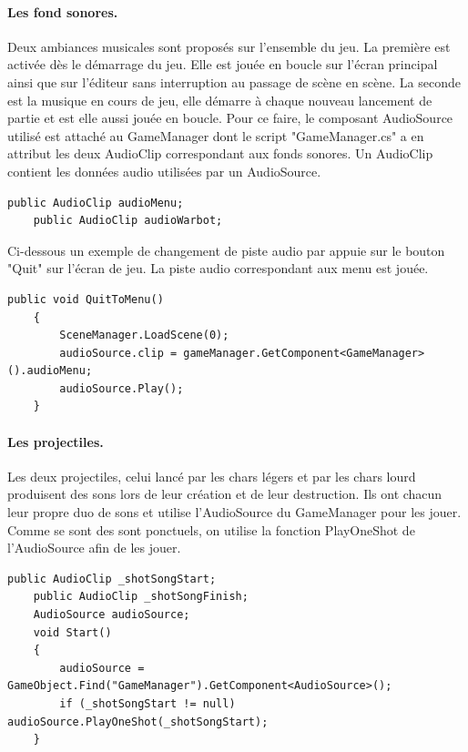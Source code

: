 \documentclass{report}
\begin{document}
\paragraph{Les fond sonores.}
Deux ambiances musicales sont proposés sur l'ensemble du jeu.
\newline La première est activée dès le démarrage du jeu. Elle est jouée en boucle sur l'écran principal ainsi que sur l'éditeur sans interruption au passage de scène en scène.
\newline  La seconde est la musique en cours de jeu, elle démarre à chaque nouveau lancement de partie et est elle aussi jouée en boucle.
\newline Pour ce faire, le composant AudioSource utilisé est attaché au GameManager dont le script "GameManager.cs" a en attribut les deux AudioClip correspondant aux fonds sonores. Un AudioClip contient les données audio utilisées par un AudioSource.
 \begin{lstlisting}[language={[Sharp]C},label={lst:GameManagerSound}, caption= Extrait du code de GameManager.cs]
    public AudioClip audioMenu;
    public AudioClip audioWarbot;
\end{lstlisting}
Ci-dessous un exemple de changement de piste audio par appuie sur le bouton "Quit" sur l'écran de jeu. La piste audio correspondant aux menu est jouée.
\begin{lstlisting}[language={[Sharp]C},label={lst:HUDmanagerQuit}, caption= Extrait du code de HUDmanager.cs ]
    public void QuitToMenu()
    {
        SceneManager.LoadScene(0);
        audioSource.clip = gameManager.GetComponent<GameManager>().audioMenu;
        audioSource.Play();
    }
\end{lstlisting}
\paragraph{Les projectiles.}
Les deux projectiles, celui lancé par les chars légers et par les chars lourd produisent des sons lors de leur création et de leur destruction.
Ils ont chacun leur propre duo de sons et utilise l'AudioSource du GameManager pour les jouer. Comme se sont des sont ponctuels, on utilise la fonction PlayOneShot de l'AudioSource afin de les jouer.
\begin{lstlisting}[language={[Sharp]C},label={lst:bulletAudio}, caption= Extrait du code de BulletScript.cs ]
    public AudioClip _shotSongStart;
    public AudioClip _shotSongFinish;
    AudioSource audioSource;
    void Start()
    {
        audioSource = GameObject.Find("GameManager").GetComponent<AudioSource>();
        if (_shotSongStart != null) audioSource.PlayOneShot(_shotSongStart);
    }
\end{lstlisting}
\end{document}
